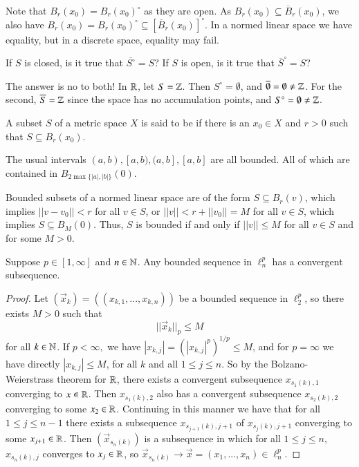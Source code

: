 \begin{eg}
    Note that $B_r(x_0) = B_r(x_0)^{\circ}$ as they are open. As $B_r(x_0) \subseteq \overline{B}_r(x_0)$, we also have $B_r(x_0) = B_r(x_0)^{\circ} \subseteq [\overline{B}_r(x_0)]^{\circ}$. In a normed linear space we have equality, but in a discrete space, equality may fail. 
\end{eg}

\begin{qst}
    If $S$ is closed, is it true that $\overline{S^{\circ}} = S$? If $S$ is open, is it true that $\overline{S}^{\circ} = S$?
\end{qst}
The answer is no to both! In $\mathbb R$, let $S = \mathbb Z$. Then $S^{\circ} = \emptyset$, and $\overline{\emptyset} = \emptyset \neq \mathbb Z$. For the second, $\overline{S} = \mathbb Z$ since the space has no accumulation points, and $S^{\circ} = \emptyset \neq \mathbb Z$.


\begin{defn}
    A subset $S$ of a metric space $X$ is said to be  if there is an $x_0 \in X$ and $r > 0$ such that $S \subseteq B_r(x_0)$.
\end{defn}

\begin{eg}
    The usual intervals $(a,b),[a,b),(a,b],[a,b]$ are all bounded. All of which are contained in $B_{2\max\{|a|,|b|\}}(0)$.
\end{eg}

\begin{eg}
    Bounded subsets of a normed linear space are of the form $S \subseteq B_r(v)$, which implies $||v-v_0|| < r$ for all $v \in S$, or $||v|| < r+||v_0|| = M$ for all $v \in S$, which implies $S \subseteq B_M(0)$. Thus, $S$ is bounded if and only if $||v|| \leq M$ for all $v \in S$ and for some $M > 0$.
\end{eg}

\begin{namthm}
    Suppose $p \in [1,\infty]$ and $n \in \mathbb N$. Any bounded sequence in $\ell_n^p$ has a convergent subsequence.
\end{namthm}
\begin{proof}
    Let $(\vec{x}_k) = ((x_{k,1},...,x_{k,n}))$ be a bounded sequence in $\ell_2^p$, so there exists $M > 0$ such that $$||\vec{x}_k||_p \leq M$$ for all $k \in \mathbb N$. If $p < \infty,$ we have $|x_{k,j}| = (|x_{k,j}|^p)^{1/p} \leq M$, and for $p = \infty$ we have directly $|x_{k,j}| \leq M$, for all $k$ and all $1 \leq j \leq n$. So by the Bolzano-Weierstrass theorem for $\mathbb R$, there exists a convergent subsequence $x_{s_1(k),1}$ converging to $x \in \mathbb R$. Then $x_{s_1(k),2}$ also has a convergent subsequence $x_{s_2(k),2}$ converging to some $x_2 \in \mathbb R$. Continuing in this manner we have that for all $1\leq j \leq n-1$ there exists a subsequence $x_{s_{j+1}(k),j+1}$ of $x_{s_j(k),j+1}$ converging to some $x_{j+1} \in \mathbb R$. Then $(\vec{x}_{s_n(k)})$ is a subsequence in which for all $1 \leq j \leq n$, $x_{s_n(k),j}$ converges to $x_j \in \mathbb R$, so $\vec{x}_{s_n(k)}\rightarrow \vec{x} = (x_1,...,x_n) \in \ell_n^p$. 
\end{proof}


